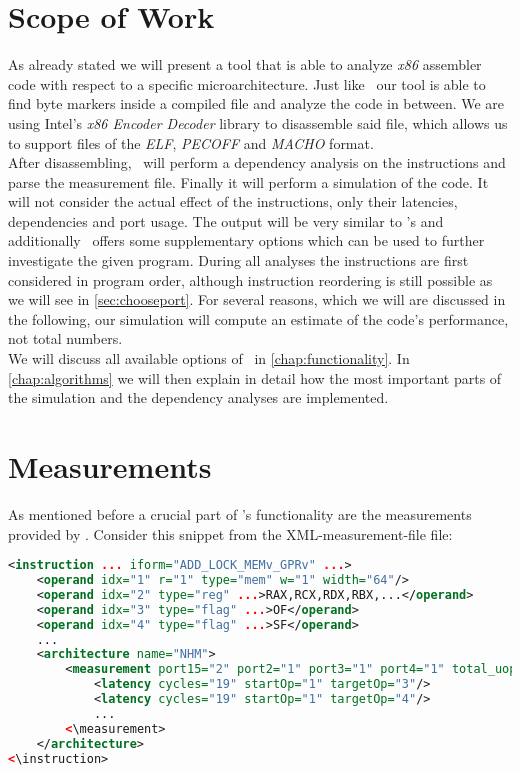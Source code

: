  
\section{Scope of Work}

As already stated we will present a tool that is able to analyze \emph{x86} assembler code with respect to a specific microarchitecture. Just like \iaca\ our tool is able to find byte markers inside a compiled file and analyze the code in between.  We are using Intel's \emph{x86 Encoder Decoder} library \cite{xed} to disassemble said file, which allows us to support files of the \emph{ELF}, \emph{PECOFF} and \emph{MACHO} format.\\

After disassembling, \suaca\ will perform a dependency analysis on the instructions and parse the measurement file. Finally it will perform a simulation of the code. It will not consider the actual effect of the instructions, only their latencies, dependencies and port usage. The output will be very similar to \iaca's and additionally \suaca\ offers some supplementary options which can be used to further investigate the given program. During all analyses the instructions are first considered in program order, although instruction reordering is still possible as we will see in \autoref{sec:chooseport}. For several reasons, which we will are discussed in the following, our simulation will compute an estimate of the code's performance, not total numbers.\\
We will discuss all available options of \suaca\ in \autoref{chap:functionality}. In \autoref{chap:algorithms} we will then explain in detail how the most important parts of the simulation and the dependency analyses are implemented.



\section{Measurements}
\label{sec:measurements}

As mentioned before a crucial part of \suaca's functionality are the measurements provided by \cite{Andreas}. Consider this snippet from the XML-measurement-file file:

\begin{lstlisting}[language=XML, basicstyle=\ttfamily\scriptsize, breaklines=false]
<instruction ... iform="ADD_LOCK_MEMv_GPRv" ...>
    <operand idx="1" r="1" type="mem" w="1" width="64"/>
    <operand idx="2" type="reg" ...>RAX,RCX,RDX,RBX,...</operand>
    <operand idx="3" type="flag" ...>OF</operand>
    <operand idx="4" type="flag" ...>SF</operand>
    ...
    <architecture name="NHM">
        <measurement port15="2" port2="1" port3="1" port4="1" total_uops="5">
            <latency cycles="19" startOp="1" targetOp="3"/>
            <latency cycles="19" startOp="1" targetOp="4"/>
            ...
        <\measurement>
    </architecture>
<\instruction>
\end{lstlisting}

